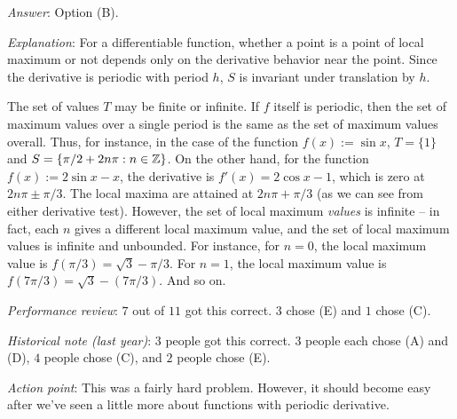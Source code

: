 \documentclass[10pt]{amsart}
\begin{document}
\begin{enumerate}
  {\em Answer}: Option (B).

  {\em Explanation}: For a differentiable function, whether a point is
  a point of local maximum or not depends only on the derivative
  behavior near the point. Since the derivative is periodic with
  period $h$, $S$ is invariant under translation by $h$.

  The set of values $T$ may be finite or infinite. If $f$ itself is
  periodic, then the set of maximum values over a single period is the
  same as the set of maximum values overall. Thus, for instance, in
  the case of the function $f(x) := \sin x$, $T = \{ 1 \}$ and $S = \{
  \pi/2 + 2n\pi : n \in \mathbb{Z}\}$. On the other hand, for the function
  $f(x) := 2\sin x - x$, the derivative is $f'(x) = 2\cos x - 1$,
  which is zero at $2n\pi \pm \pi/3$. The local maxima are attained at
  $2n\pi + \pi/3$ (as we can see from either derivative
  test). However, the set of local maximum {\em values} is infinite --
  in fact, each $n$ gives a different local maximum value, and the set
  of local maximum values is infinite and unbounded. For instance, for
  $n = 0$, the local maximum value is $f(\pi/3) = \sqrt{3} -
  \pi/3$. For $n = 1$, the local maximum value is $f(7\pi/3) =
  \sqrt{3} - (7\pi/3)$. And so on.

  {\em Performance review}: $7$ out of $11$ got this correct. $3$
  chose (E) and $1$ chose (C).

  {\em Historical note (last year)}: $3$ people got this correct. $3$
  people each chose (A) and (D), $4$ people chose (C), and $2$ people
  chose (E).

  {\em Action point}: This was a fairly hard problem. However, it
  should become easy after we've seen a little more about functions
  with periodic derivative.
\end{enumerate}
\end{document}
